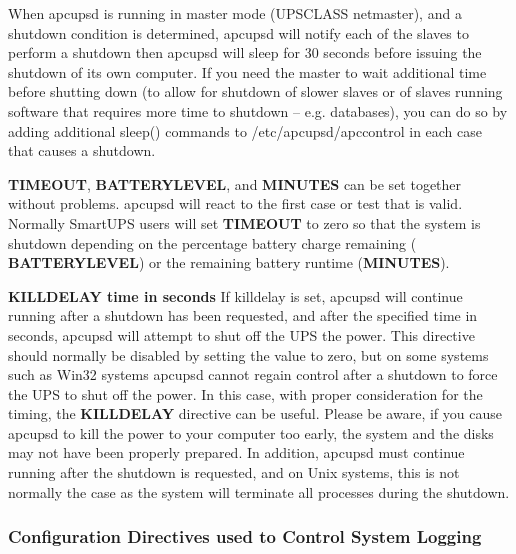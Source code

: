 {{{{{{{{{{{\begin{description}
When apcupsd is running in master mode (UPSCLASS netmaster), and a shutdown
condition is determined, apcupsd will notify each of the slaves to perform a
shutdown then apcupsd will sleep for 30 seconds before issuing the shutdown of
its own computer. If you need the master to wait additional time before
shutting down (to allow for shutdown of slower slaves or of slaves running
software that requires more time to shutdown {--} e.g. databases), you can do
so by adding additional sleep() commands to /etc/apcupsd/apccontrol in each
case that causes a shutdown.  

{\bf TIMEOUT}, {\bf BATTERYLEVEL}, and {\bf MINUTES} can be set together
without problems.  apcupsd will react to the first case or test that is valid.
Normally SmartUPS users will set {\bf TIMEOUT} to zero so that the system is
shutdown depending on the percentage battery charge remaining ({\bf
BATTERYLEVEL}) or the remaining battery runtime ({\bf MINUTES}).  

\label{KILLDELAY-_003ctime-in-seconds_003e}

\item {\bf KILLDELAY \lt{}time in seconds\gt{}}
If killdelay is set, apcupsd will continue running after a shutdown has been
requested, and after the specified time in seconds, apcupsd will attempt to
shut off the UPS the power. This directive should normally be disabled by
setting the value to zero, but on some systems such as Win32 systems apcupsd
cannot regain control after a shutdown to force the UPS to shut off the power.
In this case, with proper consideration for the timing, the {\bf KILLDELAY}
directive can be useful.  Please be aware, if you cause apcupsd to kill the
power to your computer too early, the system and the disks may not have been
properly prepared.  In addition, apcupsd must continue running after the
shutdown is requested, and on Unix systems, this is not normally the case as
the system will terminate all processes during the shutdown.  
\end{description}

\label{Configuration-Directives-used-to-Control-System-Logging}

\subsubsection*{Configuration Directives used to Control System Logging}

}}}}}}}}}}}
